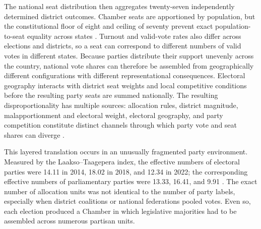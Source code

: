 \documentclass[11pt]{article}
\begin{document}
The national seat distribution then aggregates twenty-seven independently determined district outcomes. Chamber seats are apportioned by population, but the constitutional floor of eight and ceiling of seventy prevent exact population-to-seat equality across states \parencite{samuelsSnyder2001value}. Turnout and valid-vote rates also differ across elections and districts, so a seat can correspond to different numbers of valid votes in different states. Because parties distribute their support unevenly across the country, national vote shares can therefore be assembled from geographically different configurations with different representational consequences. Electoral geography interacts with district seat weights and local competitive conditions before the resulting party seats are summed nationally. The resulting disproportionality has multiple sources: allocation rules, district magnitude, malapportionment and electoral weight, electoral geography, and party competition constitute distinct channels through which party vote and seat shares can diverge \parencite{bochsler2026winners}.

This layered translation occurs in an unusually fragmented party environment. Measured by the Laakso--Taagepera index, the effective numbers of electoral parties were 14.11 in 2014, 18.02 in 2018, and 12.34 in 2022; the corresponding effective numbers of parliamentary parties were 13.33, 16.41, and 9.91 \parencite{laakso1979effective}. The exact number of allocation units was not identical to the number of party labels, especially when district coalitions or national federations pooled votes. Even so, each election produced a Chamber in which legislative majorities had to be assembled across numerous partisan units. 

\end{document}
